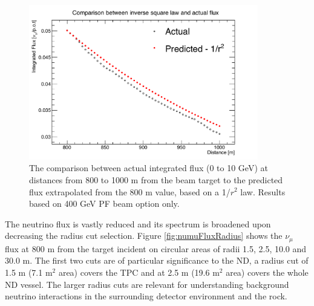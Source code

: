 \begin{figure}[htbp]
\begin{center}
 	\includegraphics[width=100mm]{Chapter3/figures/400_PF_numu_inverseSquareLaw.pdf}
      \caption{The comparison between actual integrated flux (0 to 10 GeV) at distances from 800 to 1000 m from the beam target to the predicted flux extrapolated from the 800 m value, based on a 1/$r^{2}$ law. Results based on 400 GeV PF beam option only.}
    \label{fig:fluxDistanceValues}
\end{center}
\end{figure}

The neutrino flux is vastly reduced and its spectrum is broadened upon decreasing the radius cut selection. Figure \ref{fig:numuFluxRadius} shows the $\nu_{\mu}$ flux at 800 m from the target incident on circular areas of radii 1.5, 2.5, 10.0 and 30.0 m. The first two cuts are of particular significance to the ND, a radius cut of 1.5 m (7.1 m$^{2}$ area) covers the TPC and at 2.5 m (19.6 m$^{2}$ area) covers the whole ND vessel. The larger radius cuts are relevant for understanding background neutrino interactions in the surrounding detector environment and the rock.

